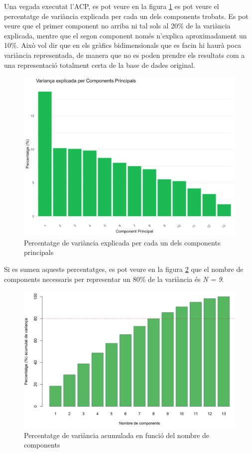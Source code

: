 Una vegada executat l'ACP, es pot veure en la figura \ref{fig:6_FM:variancia_per_components} es pot veure el percentatge de variància explicada per cada un dels components trobats. Es pot veure que el primer component no arriba ni tal sols al 20\% de la variància explicada, mentre que el segon component només n'explica aproximadament un 10\%. Això vol dir que en els gràfics bidimensionals que es facin hi haurà poca variància representada, de manera que no es poden prendre els resultats com a una representació totalment certa de la base de dades original.

\begin{figure}[H]
    \centering
    \includegraphics[width=0.8\linewidth]{Images/6_Factorial_Methods/ACP/Percentatge_varianca_per_component.png}
    \caption{Percentatge de variància explicada per cada un dels components principals}
    \label{fig:6_FM:variancia_per_components}
\end{figure}

Si es sumen aquests percentatges, es pot veure en la figura \ref{fig:6_FM:variancia_acumulada} que el nombre de components necessaris per representar un 80\% de la variància és \textit{N = 9}.

\begin{figure}[H]
    \centering
    \includegraphics[width=0.8\linewidth]{Images/6_Factorial_Methods/ACP/Variancia_acumulada.png}
    \caption{Percentatge de variància acumulada en funció del nombre de components}
    \label{fig:6_FM:variancia_acumulada}
\end{figure}

